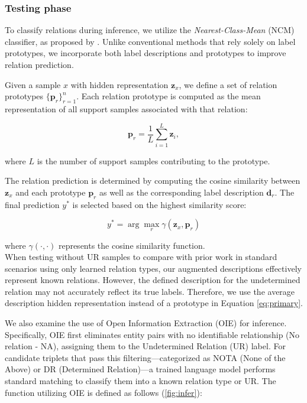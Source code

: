 \subsubsection{Testing phase} 
To classify relations during inference, we utilize the \textit{Nearest-Class-Mean} (NCM) classifier, as proposed by \citet{ma-etal-2024-making}. Unlike conventional methods that rely solely on label prototypes, we incorporate both label descriptions and prototypes to improve relation prediction.

Given a sample $x$ with hidden representation $\bm{z}_x$, we define a set of relation prototypes $\{\bm{p}_r\}_{r=1}^n$. Each relation prototype is computed as the mean representation of all support samples associated with that relation:

\begin{equation}
\bm{p}_r = \frac{1}{L} \sum_{i=1}^{L}\bm{z}_i,
\end{equation}

where $L$ is the number of support samples contributing to the prototype.

The relation prediction is determined by computing the cosine similarity between $\bm{z}_x$ and each prototype $\bm{p}_r$ as well as the corresponding label description $\bm{d}_r$. The final prediction $y^*$ is selected based on the highest similarity score:

\begin{equation}
    y^* = \arg\max_r \gamma(\bm{z}_x, \bm{p}_r)
    \label{eq:primary}
\end{equation}



where $\gamma(\cdot, \cdot)$ represents the cosine similarity function. \\
When testing without UR samples to compare with prior work in standard scenarios using only learned relation types, our augmented descriptions effectively represent known relations. However, the defined description for the undetermined relation may not accurately reflect its true labels. Therefore, we use the average description hidden representation instead of a prototype in Equation \ref{eq:primary}.

We also examine the use of Open Information Extraction (OIE) for inference. Specifically, OIE first eliminates entity pairs with no identifiable relationship (No relation - NA), assigning them to the Undetermined Relation (UR) label. For candidate triplets that pass this filtering—categorized as NOTA (None of the Above) or DR (Determined Relation)—a trained language model performs standard matching to classify them into a known relation type or UR. The function utilizing OIE is defined as follows (\ref{fig:infer}):


